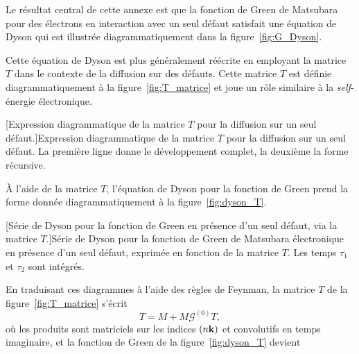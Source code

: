 Le résultat central de cette annexe est que la fonction de Green de Matsubara pour des électrons en interaction avec un seul défaut satisfait une équation de Dyson qui est illustrée diagrammatiquement dans la figure~\ref{fig:G_Dyson}.
\begin{center}
    \vspace{0.5\baselineskip}
    
    \label{fig:G_Dyson}
    \vspace{0.5\baselineskip}
\end{center}
Cette équation de Dyson est plus généralement réécrite en employant la matrice $T$ dans le contexte de la diffusion sur des défauts. Cette matrice $T$ est définie diagrammatiquement à la figure~\ref{fig:T_matrice} et joue un rôle similaire à la \textit{self}-énergie électronique.
\begin{center}
    \vspace{0.5\baselineskip}
    
    [Expression diagrammatique de la matrice $T$ pour la diffusion sur un seul défaut.]{Expression diagrammatique de la matrice $T$ pour la diffusion sur un seul défaut. La première ligne donne le développement complet, la deuxième la forme récursive.}
    \label{fig:T_matrice}
    \vspace{0.5\baselineskip}
\end{center}
À l'aide de la matrice $T$, l'équation de Dyson pour la fonction de Green prend la forme donnée diagrammatiquement à la figure~\ref{fig:dyson_T}.
\begin{center}
    \vspace{0.5\baselineskip}
    
    [Série de Dyson pour la fonction de Green en présence d'un seul défaut, via la matrice $T$.]{Série de Dyson pour la fonction de Green de Matsubara électronique en présence d'un seul défaut, exprimée en fonction de la matrice $T$. Les temps $\tau_1$ et $\tau_2$ sont intégrés.}
    \label{fig:dyson_T}
    \vspace{0.5\baselineskip}
\end{center}
En traduisant ces diagrammes à l'aide des règles de Feynman, la matrice $T$ de la figure~\ref{fig:T_matrice} s'écrit
\begin{equation}
    T = M + M\mathcal{G}^{(0)}T,\label{eqn:T_chap}
\end{equation}
où les produits sont matriciels sur les indices $(n\mathbf{k})$ et convolutifs en temps imaginaire, et la fonction de Green de la figure~\ref{fig:dyson_T} devient
